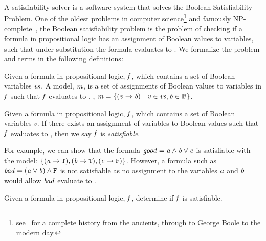 ~\label{section:sat-solving}

A satisfiability solver is a software system that solves the Boolean
Satisfiability Problem. One of the oldest problems in computer
science\footnote{see~\citet{BBH+09} for a complete history from the ancients,
  through to George Boole to the modern day.} and famously
NP-complete~\cite{10.1145/800157.805047}, the Boolean satisfiability problem is
the problem of checking if a formula in propositional logic has an assignment of
Boolean values to variables, such that under substitution the formula evaluates
to \tru{}. We formalize the problem and terms in the following definitions:

\begin{definition}[Model]
  Given a formula in propositional logic, $\mathit{f}$, which contains a set of
  Boolean variables $\mathit{vs}$. A model, $\mathit{m}$, is a set of assignments of
  Boolean values to variables in $\mathit{f}$ such that $\mathit{f}$ evaluates to
  \tru{}, \ie{}, $\mathit{m = \{ (v \rightarrow{} b)\ |\ v \in vs, b \in
    \mathbb{B}} \}$.
\end{definition}

\begin{definition}[Satisfiable]
  Given a formula in propositional logic, $\mathit{f}$, which contains a set of
  Boolean variables $v$. If there exists an assignment of variables to Boolean
  values such that $\mathit{f}$ evaluates to \tru{}, then we say $\mathit{f}$ is
  \emph{satisfiable}.
\end{definition}

For example, we can show that the formula $\mathit{good = a \wedge b \vee c}$ is
satisfiable with the model: $\{\mathit{(a \rightarrow{} \texttt{T}{}), (b \rightarrow{}
  \texttt{T}{}), (c \rightarrow{} \texttt{F}{})}\}$. However, a formula such as $\mathit{bad =
  (a \vee b) \wedge \texttt{F}{}}$ is not satisfiable as no assignment to the
variables $\mathit{a}$ and $\mathit{b}$ would allow $\mathit{bad}$ evaluate to \tru{}.

\begin{definition}
  Given a formula in propositional logic, $\mathit{f}$, determine if $\mathit{f}$ is
  satisfiable.
\end{definition}


